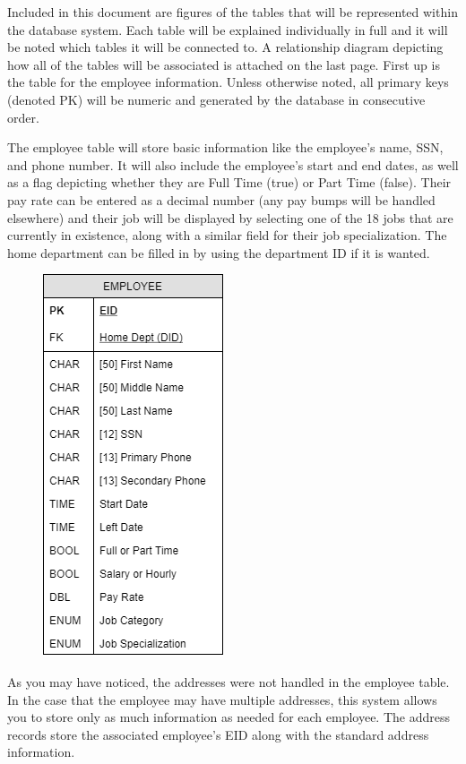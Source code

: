 \documentclass[letter,12pt]{texMemo}
\begin{document}
\maketitle
Included in this document are figures of the tables that will be represented within the database system. Each table will be explained individually in full and it will be noted which tables it will be connected to. A relationship diagram depicting how all of the tables will be associated is attached on the last page. First up is the table for the employee information. Unless otherwise noted, all primary keys (denoted PK) will be numeric and generated by the database in consecutive order.

The employee table will store basic information like the employee's name, SSN, and phone number. It will also include the employee's start and end dates, as well as a flag depicting whether they are Full Time (true) or Part Time (false). Their pay rate can be entered as a decimal number (any pay bumps will be handled elsewhere) and their job will be displayed by selecting one of the 18 jobs that are currently in existence, along with a similar field for their job specialization. The home department can be filled in by using the department ID if it is wanted.
\begin{figure}[H]
	\centering
	\includegraphics[scale=.6]{employee.png}
\end{figure}
\newpage
As you may have noticed, the addresses were not handled in the employee table. In the case that the employee may have multiple addresses, this system allows you to store only as much information as needed for each employee. The address records store the associated employee's EID along with the standard address information.
\end{document}
